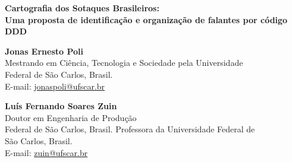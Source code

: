 







\begin{center}
	\textbf{\LARGE Cartografia dos Sotaques Brasileiros:}\\[0.5em]
	\textbf{\LARGE Uma proposta de identificação e organização de falantes por código DDD}\\[0.5em]
\end{center}

\vspace{2em}

\begin{center}
	\textbf{Jonas Ernesto Poli}\\
	Mestrando em Ciência, Tecnologia e Sociedade pela Universidade\\
	Federal de São Carlos, Brasil.\\
	E-mail: \href{mailto:jonaspoli@ufscar.br}{jonaspoli@ufscar.br}
\end{center}

\vspace{2em}

\begin{center}
	\textbf{Luís Fernando Soares Zuin}\\
    Doutor em Engenharia de Produção\\
	Federal de São Carlos, Brasil. Professora da Universidade Federal de\\
	São Carlos, Brasil.\\
	E-mail: \href{mailto:zuin@ufscar.br}{zuin@ufscar.br}
\end{center}
	
	
	
